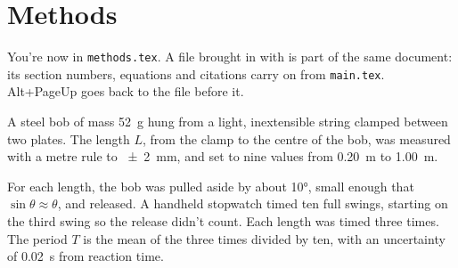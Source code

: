 \section{Methods}

You're now in \texttt{methods.tex}. A file brought in with \verb|| is part of the same document: its section numbers, equations and citations carry on from \texttt{main.tex}. Alt+PageUp goes back to the file before it.

A steel bob of mass \qty{52}{g} hung from a light, inextensible string clamped between two plates. The length $L$, from the clamp to the centre of the bob, was measured with a metre rule to \qty{\pm 2}{mm}, and set to nine values from \qty{0.20}{m} to \qty{1.00}{m}.

For each length, the bob was pulled aside by about \ang{10}, small enough that $\sin\theta \approx \theta$, and released. A handheld stopwatch timed ten full swings, starting on the third swing so the release didn't count. Each length was timed three times. The period $T$ is the mean of the three times divided by ten, with an uncertainty of \qty{0.02}{s} from reaction time.
